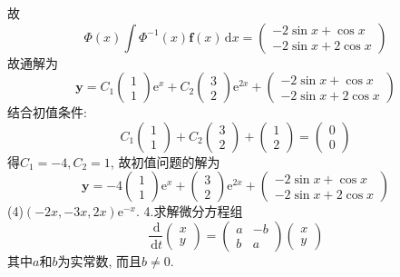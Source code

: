 \documentclass[titlepage,11pt,a4paper,twoside]{report}
\makeatletter
\newcommand\diff{\,\mathrm{d}}
\newcommand\e{\mathrm{e}}
\newcommand\bmitPhi{\bm{\varPhi}}
\newenvironment{solve}{\par
	\pushQED{\qed}%
	\normalfont \topsep1\p@\@plus6\p@\relax
	\trivlist
	\item\relax
	{\hspace*{\parindent}{\heiti 解}\@addpunct{:}}\hspace\labelsep\ignorespaces
}{%
	\popQED\endtrivlist\@endpefalse
}
\makeatother
\begin{document}
\begin{solve}
故\[\bmitPhi(x)\int\bmitPhi^{-1}(x)\bm{f}(x)\diff x=\begin{pmatrix}-2\sin x+\cos x\\-2\sin x+2\cos x\end{pmatrix}\]
故通解为
\[\bm{y}=C_1\begin{pmatrix}1\\1\end{pmatrix}\e^x+C_2\begin{pmatrix}3\\2\end{pmatrix}\e^{2x}+\begin{pmatrix}-2\sin x+\cos x\\-2\sin x+2\cos x\end{pmatrix}\]
结合初值条件:
\[C_1\begin{pmatrix}1\\1\end{pmatrix}+C_2\begin{pmatrix}3\\2\end{pmatrix}+\begin{pmatrix}1\\2\end{pmatrix}=\begin{pmatrix}0\\0\end{pmatrix}\]
得$C_1=-4,C_2=1$, 故初值问题的解为
\[\bm{y}=-4\begin{pmatrix}1\\1\end{pmatrix}\e^x+\begin{pmatrix}3\\2\end{pmatrix}\e^{2x}+\begin{pmatrix}-2\sin x+\cos x\\-2\sin x+2\cos x\end{pmatrix}\]
(4)$(-2x,-3x,2x)\e^{-x}$.
\end{solve}
4.求解微分方程组
\[\frac{\diff}{\diff t}\begin{pmatrix}x\\y\end{pmatrix}=\begin{pmatrix}a&-b\\b&a\end{pmatrix}\begin{pmatrix}x\\y\end{pmatrix}\]
其中$a$和$b$为实常数, 而且$b\neq0$.
\end{document}
